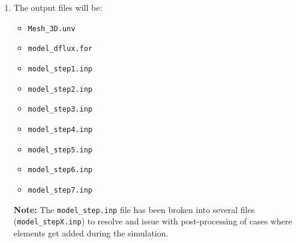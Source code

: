 \documentclass[12pt,letterpaper]{article}
\newcommand{\verbStyle}[1]{{\color{SteelBlue40}\colorbox{LightSteelBlue10}{{#1}}}}
\let\OldTexttt\texttt
\renewcommand{\texttt}[1]{\OldTexttt{\verbStyle{#1}}}
\begin{document}
\begin{itemize}
\begin{enumerate}
\begin{enumerate}
\item The output files will be:
\begin{itemize}
\item \texttt{Mesh\_3D.unv}
\item \texttt{model\_dflux.for}
\item \texttt{model\_step1.inp}
\item \texttt{model\_step2.inp}
\item \texttt{model\_step3.inp}
\item \texttt{model\_step4.inp}
\item \texttt{model\_step5.inp}
\item \texttt{model\_step6.inp}
\item \texttt{model\_step7.inp}
\end{itemize}
\textbf{Note:} The \texttt{model\_step.inp} file has been broken into several files \\
(\texttt{model\_stepX.inp}) to
resolve and issue with post-processing of cases where elements get added during the simulation.
\end{enumerate}


\end{enumerate}
\end{itemize}
\end{document}

